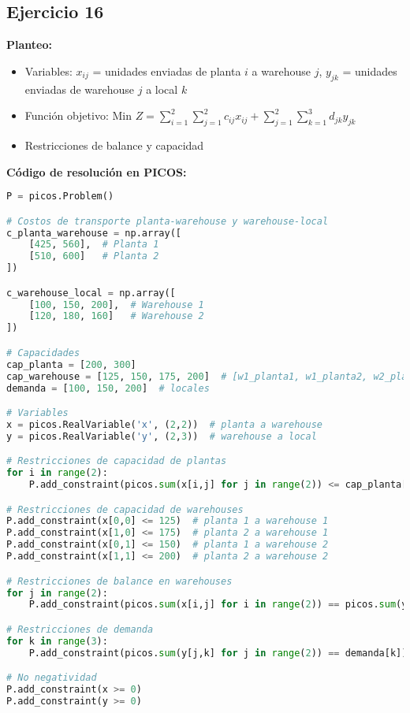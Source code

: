 \documentclass[12pt]{article}
\begin{document}
\subsection{Ejercicio 16}

\textbf{Planteo:}
\begin{itemize}
\item Variables: $x_{ij}$ = unidades enviadas de planta $i$ a warehouse $j$, $y_{jk}$ = unidades enviadas de warehouse $j$ a local $k$
\item Función objetivo: Min $Z = \sum_{i=1}^2 \sum_{j=1}^2 c_{ij}x_{ij} + \sum_{j=1}^2 \sum_{k=1}^3 d_{jk}y_{jk}$
\item Restricciones de balance y capacidad
\end{itemize}

\textbf{Código de resolución en PICOS:}
\begin{lstlisting}[language=Python]
P = picos.Problem()

# Costos de transporte planta-warehouse y warehouse-local
c_planta_warehouse = np.array([
    [425, 560],  # Planta 1
    [510, 600]   # Planta 2
])

c_warehouse_local = np.array([
    [100, 150, 200],  # Warehouse 1
    [120, 180, 160]   # Warehouse 2
])

# Capacidades
cap_planta = [200, 300]
cap_warehouse = [125, 150, 175, 200]  # [w1_planta1, w1_planta2, w2_planta1, w2_planta2]
demanda = [100, 150, 200]  # locales

# Variables
x = picos.RealVariable('x', (2,2))  # planta a warehouse
y = picos.RealVariable('y', (2,3))  # warehouse a local

# Restricciones de capacidad de plantas
for i in range(2):
    P.add_constraint(picos.sum(x[i,j] for j in range(2)) <= cap_planta[i])

# Restricciones de capacidad de warehouses
P.add_constraint(x[0,0] <= 125)  # planta 1 a warehouse 1
P.add_constraint(x[1,0] <= 175)  # planta 2 a warehouse 1
P.add_constraint(x[0,1] <= 150)  # planta 1 a warehouse 2
P.add_constraint(x[1,1] <= 200)  # planta 2 a warehouse 2

# Restricciones de balance en warehouses
for j in range(2):
    P.add_constraint(picos.sum(x[i,j] for i in range(2)) == picos.sum(y[j,k] for k in range(3)))

# Restricciones de demanda
for k in range(3):
    P.add_constraint(picos.sum(y[j,k] for j in range(2)) == demanda[k])

# No negatividad
P.add_constraint(x >= 0)
P.add_constraint(y >= 0)


\end{lstlisting}
\end{document}
